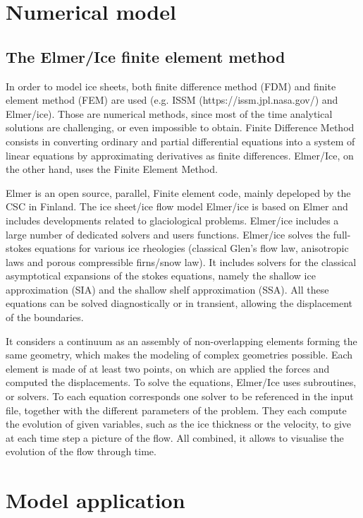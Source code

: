 \documentclass[a4paper,12pt]{article}
\begin{document}
\section{Numerical model}
\subsection{The Elmer/Ice finite element method}
In order to model ice sheets, both finite difference method (FDM) and finite element method (FEM) are used (e.g. ISSM (https://issm.jpl.nasa.gov/) and Elmer/ice). Those are numerical methods, since most of the time analytical solutions are challenging, or even impossible to obtain. Finite Difference Method consists in converting ordinary and partial differential equations into a system of linear equations by approximating derivatives as finite differences. Elmer/Ice, on the other hand, uses the Finite Element Method.

Elmer is an open source, parallel, Finite element code, mainly depeloped by the CSC in Finland. The ice sheet/ice flow model Elmer/ice is based on Elmer and includes developments related to glaciological problems. Elmer/ice includes a large number of dedicated solvers and users functions.
Elmer/ice solves the full-stokes equations for various ice rheologies (classical  Glen's flow law, anisotropic laws and porous compressible firns/snow law). It includes solvers for the classical asymptotical expansions of the stokes equations, namely the shallow 	ice approximation (SIA) and the shallow shelf approximation (SSA). All these equations can be solved diagnostically or in transient, allowing the displacement of the boundaries. 

It considers a continuum as an assembly of non-overlapping elements forming the same geometry, which makes the modeling of complex geometries possible. Each element is made of at least two points, on which are applied the forces and computed the displacements. To solve the equations, Elmer/Ice uses subroutines, or solvers. To each equation corresponds one solver to be referenced in the input file, together with the different parameters of the problem. They each compute the evolution of given variables, such as the ice thickness or the velocity, to give at each time step a picture of the flow. All combined, it allows to visualise the evolution of the flow through time.
\section{Model application}
\end{document}
